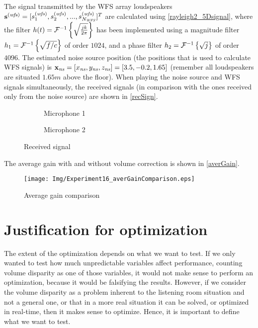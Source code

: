 The signal transmitted by the WFS array loudspeakers $\vec{\signal[wfs][time]} = [\signal[wfs][time]_1, \signal[wfs][time]_2, ..., \signal[wfs][time]_{\numWFS}]^T$ are calculated using \autoref{rayleigh2_5Dsignal}, where the filter $\freqFilter(t) = \FourierTransform{\sqrt{\frac{jk}{2\pi}}}[inverse]$ has been implemented using a magnitude filter $\freqFilter[time][magnitude] = \FourierTransform{\sqrt{f/c}}[inverse]$ of order $1024$, and a phase filter $\freqFilter[time][phase] = \FourierTransform{\sqrt{j}}[inverse]$ of order $4096$. The estimated noise source position (the positions that is used to calculate WFS signals) is $\Position[ns] = [\Position[ns][x], \Position[ns][y], \Position[ns][z]] = [3.5, -0.2, 1.65]$ (remember all loudspeakers are situated $1.65\si{m}$ above the floor). 
When playing the noise source and WFS signals simultaneously, the received signals (in comparison with the ones received only from the noise source) are shown in \autoref{recSign}.
\begin{figure}[h]
	\begin{subfigure}[b]{0.49\textwidth}
		\centering
		\def\svgwidth{0.9\columnwidth}
		\graphicspath{{Img/}}
		{\fontsize{5}{12}\selectfont
			
		}
		\caption{Microphone 1}
	\end{subfigure}
	\begin{subfigure}[b]{0.49\textwidth}
		\centering
		\def\svgwidth{0.9\columnwidth}
		\graphicspath{{Img/}}
		{\fontsize{5}{12}\selectfont
			
		}
		\caption{Microphone 2}
	\end{subfigure}
	\caption{Received signal}
	\label{recSign}
\end{figure}

The average gain with and without volume correction is shown in \autoref{averGain}.
\begin{figure}[h]
	\centering
	\texttt{[image: Img/Experiment16\_averGainComparison.eps]}
	\caption{Average gain comparison}
	\label{averGain}
\end{figure}

\section{Justification for optimization}
The extent of the optimization depends on what we want to test. If we only wanted to test how much unpredictable variables affect performance, counting volume disparity as one of those variables, it would not make sense to perform an optimization, because it would be falsifying the results. However, if we consider the volume disparity as a problem inherent to the listening room situation and not a general one, or that in a more real situation it can be solved, or optimized in real-time, then it makes sense to optimize. Hence, it is important to define what we want to test.

